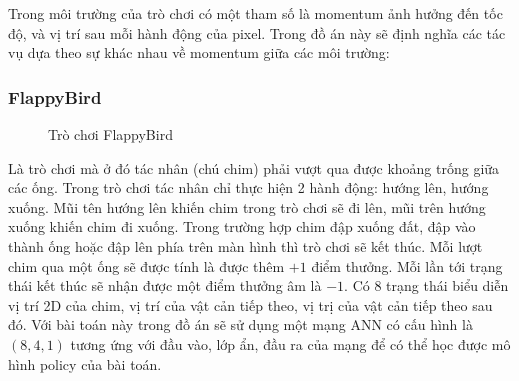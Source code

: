 Trong môi trường của trò chơi có một tham số là momentum ảnh hưởng đến tốc độ, và vị trí sau mỗi hành động của pixel. Trong đồ án này sẽ định nghĩa các tác vụ dựa theo sự khác nhau về momentum giữa các môi trường:
\begin{table} [H]
    \begin{center}
    \caption{Danh sách các tác vụ thực nghiệm bài toán Pixelcopter}

    \end{center}
    \label{tab:result:flappybird}
\end{table}

\subsubsection{FlappyBird}
\begin{figure}[h!]
    \centering
    \caption{Trò chơi FlappyBird}
    \label{fig:flappybird}
\end{figure}
Là trò chơi mà ở đó tác nhân (chú chim) phải vượt qua được khoảng trống giữa các ống. Trong trò chơi tác nhân chỉ thực hiện 2 hành động: hướng lên, hướng xuống. Mũi tên hướng lên khiến chim trong trò chơi sẽ đi lên, mũi trên hướng xuống khiến chim đi xuống. Trong trường hợp chim đập xuống đất, đập vào thành ống hoặc đập lên phía trên màn hình thì trò chơi sẽ kết thúc. Mỗi lượt chim qua một ống sẽ được tính là được thêm $+1$ điểm thưởng. Mỗi lần tới trạng thái kết thúc sẽ nhận được một điểm thưởng âm là $-1$. Có 8 trạng thái biểu diễn vị trí 2D của chim, vị trí của vật cản tiếp theo, vị trị của vật cản tiếp theo sau đó. Với bài toán này trong đồ án sẽ sử dụng một mạng ANN có cấu hình là $(8,4,1)$ tương ứng với đầu vào, lớp ẩn, đầu ra của mạng để có thể học được mô hình policy của bài toán.

